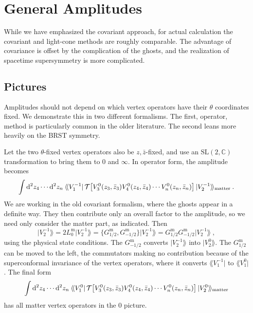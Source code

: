\section{General Amplitudes}

While we have emphasized the covariant approach, for actual calculation the covariant and light-cone methods are roughly comparable. The advantage of covariance is offset by the complication of the ghosts, and the realization of spacetime supersymmetry is more complicated.

\subsection*{Pictures}

Amplitudes should not depend on which vertex operators have their $\theta$ coordinates fixed. We demonstrate this in two different formalisms. The first, operator, method is particularly common in the older literature. The second leans more heavily on the BRST symmetry.

Let the two $\theta$-fixed vertex operators also be $z,\bar{z}$-fixed, and use an $\mathrm{SL}(2,\mathbb{C})$ transformation to bring them to $0$ and $\infty$. In operator form, the amplitude becomes
\begin{equation}
	\int \mathrm{d}^2 z_4 \cdots \mathrm{d}^2 z_n \:\langle\!\langle V_1^{-1}\rvert\,\mathcal{T}\bigl[V_3^0(z_3,\bar{z}_3)V_4^0(z_4,\bar{z}_4)\cdots V_n^0(z_n,\bar{z}_n)\bigr]\,\lvert V_2^{-1}\rangle\!\rangle_{\mathrm{matter}} \:. \label{12.5.1}
\end{equation}
We are working in the old covariant formalism, where the ghosts appear in a definite way. They then contribute only an overall factor to the amplitude, so we need only consider the matter part, as indicated. Then
\begin{equation}
	\lvert V_2^{-1}\rAngle = 2L_0^{\mathrm{m}}\lvert V_2^{-1}\rAngle = \{G_{1/2}^{\mathrm{m}}, G_{-1/2}^{\mathrm{m}}\}\lvert V_2^{-1}\rAngle = G_{1/2}^{\mathrm{m}}G_{-1/2}^{\mathrm{m}}\lvert V_2^{-1}\rAngle \:, \label{12.5.2}
\end{equation}
using the physical state conditions. The $G_{-1/2}^{\mathrm{m}}$ converts $\lvert V_2^{-1}\rAngle$ into $\lvert V_2^0\rAngle$. The $G_{1/2}^{\mathrm{m}}$ can be moved to the left, the commutators making no contribution because of the superconformal invariance of the vertex operators, where it converts $\lAngle V_1^{-1}\rvert$ to $\lAngle V_1^0\rvert$. The final form
\begin{equation}
	\int \mathrm{d}^2 z_4 \cdots \mathrm{d}^2 z_n \:\langle\!\langle V_1^0\rvert\,\mathcal{T}\bigl[V_3^0(z_3,\bar{z}_3)V_4^0(z_4,\bar{z}_4)\cdots V_n^0(z_n,\bar{z}_n)\bigr]\,\lvert V_2^0\rangle\!\rangle_{\mathrm{matter}} \label{12.5.3}
\end{equation}
has all matter vertex operators in the $0$ picture.

